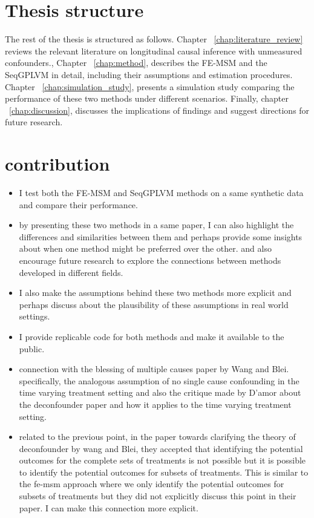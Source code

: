 \section{Thesis structure}
The rest of the thesis is structured as follows. Chapter ~\ref{chap:literature_review} reviews the 
relevant literature on longitudinal causal inference with unmeasured confounders.,
Chapter ~\ref{chap:method}, describes the FE-MSM and the 
SeqGPLVM in detail, including their assumptions and estimation procedures. 
Chapter ~\ref{chap:simulation_study}, presents a simulation study comparing the performance of these 
two methods under different scenarios. Finally, chapter ~\ref{chap:discussion}, discusses the 
implications of findings and suggest directions for future research.

\section{contribution}
\begin{itemize}
    \item I test both the FE-MSM and SeqGPLVM methods on a same 
    synthetic data and compare their performance. 
    \item by presenting these two methods in a same paper, 
    I can also highlight the differences and similarities between them 
    and perhaps provide some insights about when one method might be preferred over the other. and also 
    encourage future research to explore the connections between methods developed in different fields.
    \item I also make the assumptions behind these two methods more explicit and perhaps discuss 
    about the plausibility of these assumptions in real world settings. 
    \item I provide replicable code for both methods and make it available to the public. 
    \item connection with the blessing of multiple causes paper by Wang and Blei. specifically, 
    the analogous assumption of no single cause confounding in the time varying treatment setting 
    and also the critique made by D'amor about the deconfounder paper 
    and how it applies to the time varying treatment setting. 
    \item related to the previous point, in the paper towards clarifying the
    theory of deconfounder by wang and Blei, they accepted that identifying the potential 
    outcomes for the complete sets of treatments is not possible but it is 
    possible to identify the potential outcomes for subsets of treatments. 
    This is similar to the fe-msm approach where we only identify the potential outcomes for subsets of treatments 
    but they did not explicitly discuss this point in their paper. I can make this connection more explicit. 
\end{itemize}

    